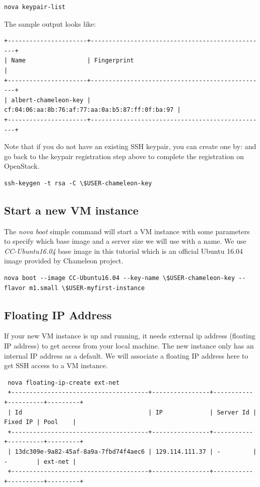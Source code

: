 \begin{lstlisting}
nova keypair-list
\end{lstlisting}

The sample output looks like:

\begin{lstlisting}
+----------------------+-------------------------------------------------+
| Name                 | Fingerprint                                     |
+----------------------+-------------------------------------------------+
| albert-chameleon-key | cf:04:06:aa:8b:76:af:77:aa:0a:b5:87:ff:0f:ba:97 |
+----------------------+-------------------------------------------------+
\end{lstlisting}

Note that if you do not have an existing SSH keypair, you can create
one by: and go back to the keypair registration step above to complete
the registration on OpenStack.

\begin{lstlisting}
ssh-keygen -t rsa -C \$USER-chameleon-key
\end{lstlisting}


\subsection{Start a new VM instance}

The \textit{nova boot} simple command will start a VM instance with
some parameters to specify which base image and a server size we will
use with a name. We use \textit{CC-Ubuntu16.04} base image in this
tutorial which is an official Ubuntu 16.04 image provided by Chameleon
project.

\begin{lstlisting}
nova boot --image CC-Ubuntu16.04 --key-name \$USER-chameleon-key --flavor m1.small \$USER-myfirst-instance
\end{lstlisting}

\subsection{Floating IP Address}

If your new VM instance is up and running, it needs external ip
address (floating IP address) to get access from your local
machine. The new instance only has an internal IP address as a
default. We will associate a floating IP address here to get SSH
access to a VM instance.

\begin{lstlisting}
 nova floating-ip-create ext-net
 +--------------------------------------+----------------+-----------+----------+---------+
 | Id                                   | IP             | Server Id | Fixed IP | Pool    |
 +--------------------------------------+----------------+-----------+----------+---------+
 | 13dc309e-9a82-45af-8a9a-7fbd74f4aec6 | 129.114.111.37 | -         | -        | ext-net |
 +--------------------------------------+----------------+-----------+----------+---------+
\end{lstlisting}

